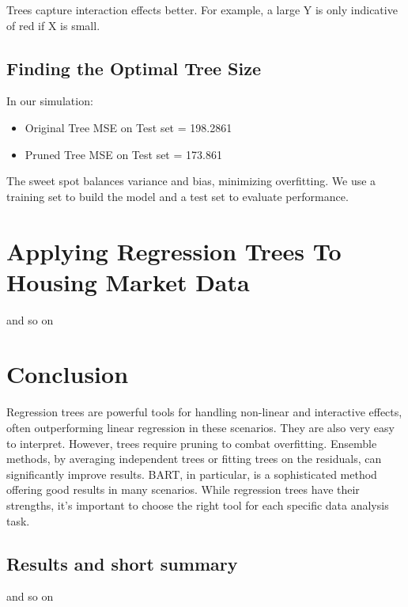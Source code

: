 \documentclass[12pt]{article}
\begin{document}
Trees capture interaction effects better. For example, a large Y is only indicative of red if X is small.

 \subsection{Finding the Optimal Tree Size}
In our simulation:
\begin{itemize}
    \item Original Tree MSE on Test set = 198.2861 
    \item Pruned Tree MSE on Test set = 173.861 
\end{itemize}

The sweet spot balances variance and bias, minimizing overfitting. We use a training set to build the model and a test set to evaluate performance.



\section{Applying Regression Trees To Housing Market Data}


and so on






 \section{Conclusion}
Regression trees are powerful tools for handling non-linear and interactive effects, often outperforming linear regression in these scenarios. They are also very easy to interpret. However, trees require pruning to combat overfitting. Ensemble methods, by averaging independent trees or fitting trees on the residuals, can significantly improve results. BART, in particular, is a sophisticated method offering good results in many scenarios. While regression trees have their strengths, it's important to choose the right tool for each specific data analysis task.

 

\subsection{Results and short summary}
and so on
\end{document}
